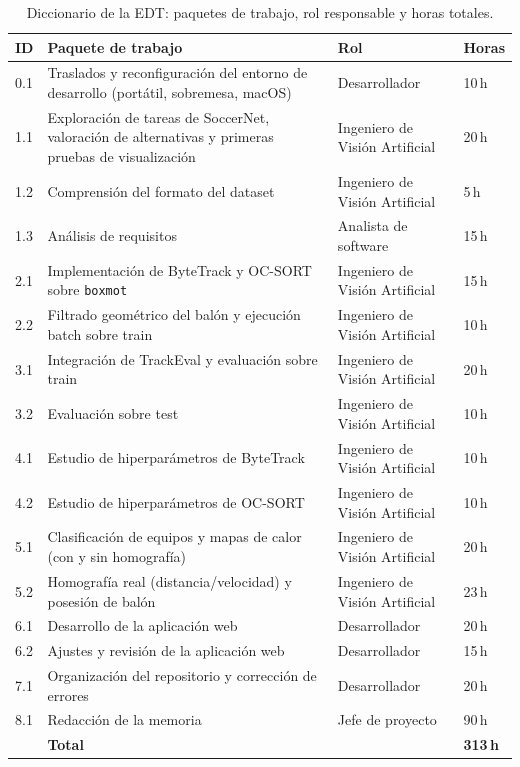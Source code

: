 \begin{table}[htp]
\centering
\caption{Diccionario de la EDT: paquetes de trabajo, rol responsable y horas totales.}
\label{tab:gestion-edt-diccionario}
\small
\renewcommand{\arraystretch}{1.1}
\begin{tabular}{|p{1.0cm}|p{4.6cm}|p{3.6cm}|p{1.4cm}|}
\hline
\rowcolor{gray!25}
\textbf{ID} & \textbf{Paquete de trabajo} & \textbf{Rol} & \textbf{Horas} \\
\hline
0.1 & Traslados y reconfiguración del entorno de desarrollo (portátil,
  sobremesa, macOS) & Desarrollador & 10\,h \\
\hline
1.1 & Exploración de tareas de SoccerNet, valoración de alternativas y
  primeras pruebas de visualización & Ingeniero de Visión Artificial & 20\,h \\
\hline
1.2 & Comprensión del formato del dataset
  & Ingeniero de Visión Artificial & 5\,h \\
\hline
1.3 & Análisis de requisitos &
  Analista de software & 15\,h \\
\hline
2.1 & Implementación de ByteTrack y OC-SORT sobre \texttt{boxmot} &
  Ingeniero de Visión Artificial & 15\,h \\
\hline
2.2 & Filtrado geométrico del balón y ejecución batch sobre train &
  Ingeniero de Visión Artificial & 10\,h \\
\hline
3.1 & Integración de TrackEval y evaluación sobre train &
  Ingeniero de Visión Artificial & 20\,h \\
\hline
3.2 & Evaluación sobre test &
  Ingeniero de Visión Artificial & 10\,h \\
\hline
4.1 & Estudio de hiperparámetros de ByteTrack &
  Ingeniero de Visión Artificial & 10\,h \\
\hline
4.2 & Estudio de hiperparámetros de OC-SORT &
  Ingeniero de Visión Artificial & 10\,h \\
\hline
5.1 & Clasificación de equipos y mapas de calor (con y sin homografía) &
  Ingeniero de Visión Artificial & 20\,h \\
\hline
5.2 & Homografía real (distancia/velocidad) y posesión de balón &
  Ingeniero de Visión Artificial & 23\,h \\
\hline
6.1 & Desarrollo de la aplicación web & Desarrollador & 20\,h \\
\hline
6.2 & Ajustes y revisión de la aplicación web &
  Desarrollador & 15\,h \\
\hline
7.1 & Organización del repositorio y corrección de errores &
  Desarrollador & 20\,h \\
\hline
8.1 & Redacción de la memoria & Jefe de proyecto & 90\,h \\
\hline
\rowcolor{gray!10}
 & \textbf{Total} & & \textbf{313\,h} \\
\hline
\end{tabular}
\end{table}

